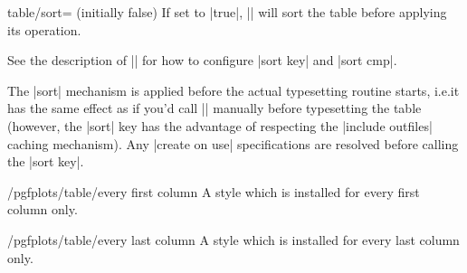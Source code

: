 \documentclass[a4paper]{ltxdoc}
\begin{document}
\begin{pgfplotskey}{table/sort= (initially false)}
    If set to |true|, |\pgfplotstabletypeset| will sort the table before
    applying its operation.

    See the description of |\pgfplotstablesort| for how to configure |sort key|
    and |sort cmp|.
\begin{codeexample}[]
\end{codeexample}

    The |sort| mechanism is applied before the actual typesetting routine
    starts, i.e.\@ it has the same effect as if you'd call |\pgfplotstablesort|
    manually before typesetting the table (however, the |sort| key has the
    advantage of respecting the |include outfiles| caching mechanism). Any
    |create on use| specifications are resolved before calling the |sort key|.

\end{pgfplotskey}

\begin{stylekey}{/pgfplots/table/every first column}
    A style which is installed for every first column only.
\begin{codeexample}[narrow]
\end{codeexample}
\end{stylekey}

\begin{stylekey}{/pgfplots/table/every last column}
    A style which is installed for every last column only.
\end{stylekey}
\end{document}
